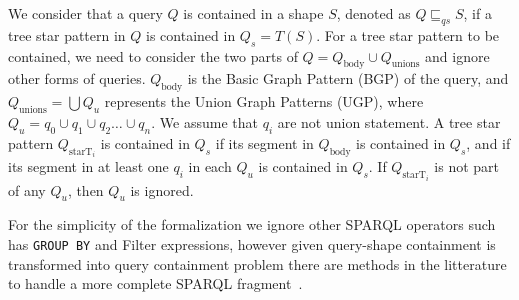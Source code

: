 We consider that a query $Q$ is contained in a shape $S$, denoted as $Q \sqsubseteq_{qs} S$, if a tree star pattern in $Q$ is contained in $Q_s = T(S)$. 
For a tree star pattern to be contained, we need to consider the two parts of $Q = Q_{\text{body}} \cup Q_{\text{unions}}$ and ignore other forms of queries.
$Q_{\text{body}}$ is the Basic Graph Pattern (BGP) of the query, and $Q_{\text{unions}} = \bigcup Q_u$ represents the Union Graph Patterns (UGP), where $Q_u = q_0 \cup q_1 \cup q_2 \dots \cup q_n$.
We assume that $q_i$ are not union statement.
A tree star pattern $Q_{\text{starT}_i}$ is contained in $Q_s$ if its segment in $Q_{\text{body}}$ is contained in $Q_s$, and if its segment in at least one $q_i$ in each $Q_u$ is contained in $Q_s$. 
If $Q_{\text{starT}_i}$ is not part of any $Q_u$, then $Q_u$ is ignored.

For the simplicity of the formalization we ignore other SPARQL operators such has \texttt{GROUP BY} and Filter expressions,
however given query-shape containment is transformed into query containment problem there are methods in the litterature to handle a more complete SPARQL fragment~\cite{Spasi2023}.

